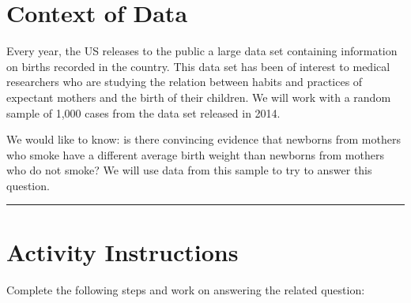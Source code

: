 \documentclass[oneside,openany]{book}
\begin{document}
\section{Context of Data}\label{context-of-data}

Every year, the US releases to the public a large data set containing information on births recorded in the country. This data set has been of interest to medical researchers who are studying the relation between habits and practices of expectant mothers and the birth of their children. We will work with a random sample of 1,000 cases from the data set released in 2014.

We would like to know: is there convincing evidence that newborns from mothers who smoke have a different average birth weight than newborns from mothers who do not smoke? We will use data from this sample to try to answer this question.

\begin{center}\rule{0.5\linewidth}{0.5pt}\end{center}

\section{Activity Instructions}\label{activity-instructions-3}

Complete the following steps and work on answering the related question:
\end{document}
